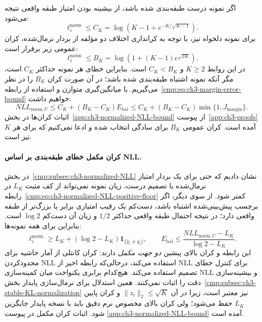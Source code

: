 اگر نمونه درست طبقه‌بندی شده باشد، از بیشینه بودن امتیاز طبقه واقعی نتیجه می‌شود:
\begin{equation}\label{cmp:eq:ch3-normalized-correct-bound}
\ell_i^{\mathrm{norm}}\le
C_K=\log\left(K-1+e^{-K/\sqrt{K-1}}\right).
\end{equation}
برای نمونه دلخواه نیز، با توجه به کرانداری اختلاف دو مؤلفه از بردار نرمال‌شده، کران عمومی زیر برقرار است:
\begin{equation}\label{cmp:eq:ch3-normalized-global-bound}
\ell_i^{\mathrm{norm}}\le
B_K=\log\left(1+(K-1)e^{\sqrt{2K}}\right).
\end{equation}
در این روابط $K\ge2$ و $C_K<B_K$ است. بنابراین خطای هر نمونه حداکثر $C_K$ است، مگر آنکه نمونه اشتباه طبقه‌بندی شده باشد؛ در آن صورت کران $B_K$ را در نظر می‌گیریم. با میانگین‌گیری متوازن و استفاده از رابطه~\eqref{cmp:eq:ch3-margin-error-bound} خواهیم داشت:
\begin{equation}\label{cmp:eq:ch3-normalized-NLL-margin-bound}
\boxed{
NLL_{\mathrm{norm},U}
\le C_K+(B_K-C_K)E_{\mathrm{bal}}
\le C_K+(B_K-C_K)\min\{1,J_{\mathrm{margin}}\}.}
\end{equation}
اثبات کران‌ها در بخش~\ref{app:ch3-normalized-NLL-bound} از پیوست~\ref{app:ch3-proofs} آمده است. کران عمومی $B_K$ برای سادگی انتخاب شده و ادعا نمی‌کنیم که برای هر $K$ تیز است.


\paragraph{کران مکمل خطای طبقه‌بندی بر اساس NLL.}
در بخش~\ref{cmp:subsec:ch3-normalized-NLL}
نشان دادیم که حتی برای یک
بردار امتیاز نرمال‌شده با تصمیم درست،
زیان نمونه نمی‌تواند از کف مثبت
$L_K$ در
رابطه~\eqref{cmp:eq:ch3-normalized-NLL-positive-floor}
کمتر شود. از سوی دیگر،
اگر برچسب پیش‌بینی‌شده اشتباه باشد،
دست‌کم یک رقیب امتیازی برابر یا
بزرگ‌تر از طبقه واقعی دارد؛
در نتیجه احتمال طبقه واقعی حداکثر
$1/2$ و زیان آن دست‌کم $\log2$ است.
بنابراین برای همه نمونه‌ها:
\begin{equation}\label{cmp:eq:ch3-normalized-NLL-error-lower-bound}
\boxed{
\ell_i^{\mathrm{norm}}
\ge L_K+
(\log2-L_K)\mathbf1_{\{\widehat y_i\ne y_i\}},
\qquad
E_{\mathrm{bal}}\le
\frac{NLL_{\mathrm{norm},U}-L_K}{\log2-L_K}.
}
\end{equation}
این رابطه و کران بالای پیشین
\emph{دو جهت مکمل} دارند:
کران کانتلی از آمار حاشیه
برای محدودکردن NLL استفاده می‌کند،
درحالی‌که رابطه اخیر از NLL
برای کنترل خطای تصمیم استفاده
می‌کند. هیچ‌کدام برابری یکنواخت
میان کمینه‌سازی NLL و
بیشینه‌سازی دقت را اثبات نمی‌کنند.
همین استدلال برای نرمال‌سازی
پایدار بخش~\ref{cmp:subsec:ch3-stable-KL-normalization}
نیز معتبر است، زیرا در آن
$\|z_i\|_2\le\sqrt K$ و
کران پایین $L_K$ حفظ می‌شود؛
ولی کران بالای مخصوص نرم
دقیق باید با نسخه پایدار
جایگزین شود. اثبات کران مکمل
در پیوست
\ref{app:ch3-normalized-NLL-bound}
آمده است.

